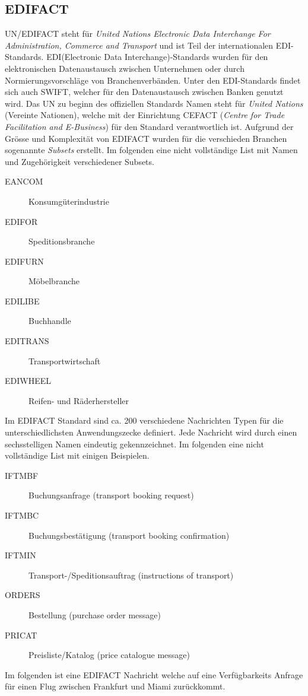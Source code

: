 \subsection{EDIFACT}
UN/EDIFACT steht für \textit{United Nations Electronic Data Interchange For Administration, Commerce and Transport} und ist Teil der internationalen EDI-Standards. EDI(Electronic Data Interchange)-Standards wurden für den elektronischen Datenaustausch zwischen Unternehmen oder durch Normierungsvorschläge von Branchenverbänden. Unter den EDI-Standards findet sich auch SWIFT, welcher für den Datenaustausch zwischen Banken genutzt wird.
Das UN zu beginn des offiziellen Standards Namen steht für \textit{United Nations} (Vereinte Nationen), welche mit der Einrichtung CEFACT (\textit{Centre for Trade Facilitation and E-Business}) für den Standard verantwortlich ist. Aufgrund der Grösse und Komplexität von EDIFACT wurden für die verschieden Branchen sogenannte \textit{Subsets} erstellt. Im folgenden eine nicht vollständige List mit Namen und Zugehörigkeit verschiedener Subsets\citep[S.1]{thopasEDIFACT}.
\begin{description}
	\item [EANCOM] Konsumgüterindustrie
	\item [EDIFOR] Speditionsbranche
	\item [EDIFURN] Möbelbranche
	\item [EDILIBE] Buchhandle
	\item [EDITRANS] Transportwirtschaft
	\item [EDIWHEEL] Reifen- und Räderhersteller
\end{description}
Im EDIFACT Standard sind ca. 200 verschiedene Nachrichten Typen für die unterschiedlichsten Anwendungszecke definiert. Jede Nachricht wird durch einen sechsstelligen Namen eindeutig gekennzeichnet. Im folgenden eine nicht vollständige List mit einigen Beispielen.
\begin{description}
	\item [IFTMBF] Buchungsanfrage (transport booking request)
	\item [IFTMBC] Buchungsbestätigung (transport booking confirmation)
	\item [IFTMIN] Transport-/Speditionsauftrag (instructions of transport)
	\item [ORDERS] Bestellung (purchase order message)
	\item [PRICAT] Preisliste/Katalog (price catalogue message)
\end{description}
Im folgenden ist eine EDIFACT Nachricht welche auf eine Verfügbarkeits Anfrage für einen Flug zwischen Frankfurt und Miami zurückkommt.
